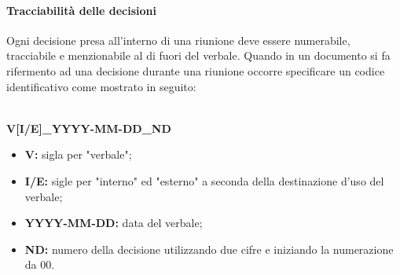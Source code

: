     \paragraph{Tracciabilità delle decisioni}
      Ogni decisione presa all'interno di una riunione deve essere numerabile, tracciabile e menzionabile al di fuori del verbale. Quando in un documento si fa rifermento ad una decisione durante una riunione
      occorre specificare un codice identificativo come mostrato in seguito:\\\\
      \centerline{\textbf{V[I/E]\_YYYY-MM-DD\_ND}} 
      \begin{itemize}
      	\item \textbf{V:} sigla per "verbale";
      	\item \textbf{I/E:} sigle per "interno" ed "esterno" a seconda della destinazione d'uso del verbale;
      	\item \textbf{YYYY-MM-DD:} data del verbale;
      	\item \textbf{ND:} numero della decisione utilizzando due cifre e iniziando la numerazione da 00.
      \end{itemize}
